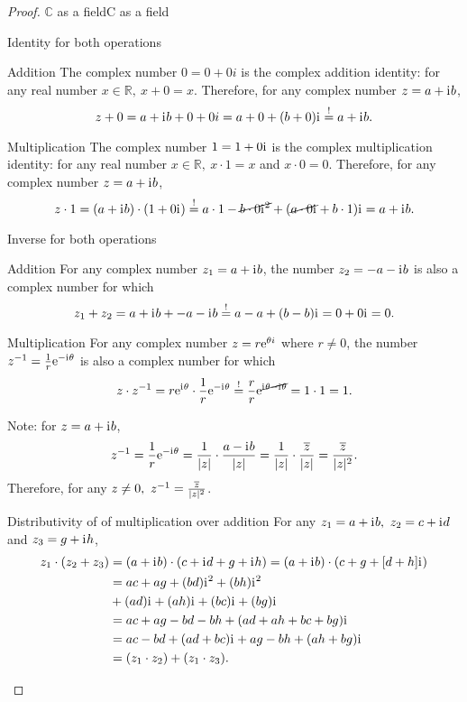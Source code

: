 \begin{proof}{$\bm{\mathbb{C}}$ as a field}{C as a field}
\begin{descitemize}
		\item[Identity for both operations]~\\
			\begin{listitemize}
			\item[Addition] The complex number $0=0+0i$ is the complex addition identity: for any real number $x\in\mathbb{R},\ x+0=x$. Therefore, for any complex number $z=a+\mathrm{i}\mkern1mu b$,
				\[
					z+0 = a+\mathrm{i}\mkern1mu b + 0+0i = a+0 + (b+0)\mathrm{i}\mkern1mu \overset{!}{=} a+\mathrm{i}\mkern1mu b.
				\]
			\item[Multiplication] The complex number $1=1+0\mathrm{i}\mkern1mu$ is the complex multiplication identity: for any real number $x\in\mathbb{R},\ x\cdot1=x$ and $x\cdot0=0$. Therefore, for any complex number $z=a+\mathrm{i}\mkern1mu b$,
				\[
					z\cdot1 = (a+\mathrm{i}\mkern1mu b)\cdot(1+0\mathrm{i}\mkern1mu) \overset{!}{=}a\cdot1-\cancel{b\cdot0\mathrm{i}\mkern1mu^{2}} + (\cancel{a\cdot0\mathrm{i}\mkern1mu}+b\cdot1)\mathrm{i}\mkern1mu = a+\mathrm{i}\mkern1mu b.
				\]

			\end{listitemize}
		
		\item[Inverse for both operations]~\\
			\begin{listitemize}
			\item[Addition] For any complex number $z_{1}=a+\mathrm{i}\mkern1mu b$, the number $z_{2}=-a-\mathrm{i}\mkern1mu b$ is also a complex number for which
				\[
					z_{1} + z_{2} = a+\mathrm{i}\mkern1mu b + -a-\mathrm{i}\mkern1mu b \overset{!}{=} a-a + (b-b)\mathrm{i}\mkern1mu = 0 + 0\mathrm{i}\mkern1mu = 0.
				\]
			\item[Multiplication] For any complex number $z=r\mathrm{e}^{\theta i}$ where $r\neq0$, the number $z^{-1}=\frac{1}{r}\mathrm{e}^{-\mathrm{i}\mkern1mu\theta}$ is also a complex number for which
				\[
					z \cdot z^{-1} = r\mathrm{e}^{\mathrm{i}\mkern1mu\theta} \cdot \frac{1}{r}\mathrm{e}^{-\mathrm{i}\mkern1mu\theta} \overset{!}{=} \frac{r}{r}\mathrm{e}^{\cancel{\mathrm{i}\mkern1mu\theta - \mathrm{i}\mkern1mu\theta}} = 1\cdot1 = 1.
				\]
				
			Note: for $z=a+\mathrm{i}\mkern1mu b$,
			\[
				z^{-1} = \frac{1}{r}\mathrm{e}^{-\mathrm{i}\mkern1mu\theta} = \frac{1}{|z|}\cdot\frac{a-\mathrm{i}\mkern1mu b}{|z|} = \frac{1}{|z|}\cdot\frac{\overline{z}}{|z|} = \frac{\overline{z}}{|z|^{2}}.
			\]
			Therefore, for any $z\neq0,\ z^{-1} = \frac{\overline{z}}{|z|^{2}}$.
			\end{listitemize}

		\item[Distributivity of of multiplication over addition] For any $z_{1}=a+\mathrm{i}\mkern1mu b,\ z_{2}=c+\mathrm{i}\mkern1mu d$ and $z_{3}=g+\mathrm{i}\mkern1mu h$,
			\begin{align*}
				z_{1}\cdot(z_{2}+z_{3}) &= (a+\mathrm{i}\mkern1mu b)\cdot(c+\mathrm{i}\mkern1mu d + g+\mathrm{i}\mkern1mu h) = (a+\mathrm{i}\mkern1mu b)\cdot(c+g + [d+h]\mathrm{i}\mkern1mu)\\
				&= ac + ag + (bd)\mathrm{i}\mkern1mu^{2} + (bh)\mathrm{i}\mkern1mu^{2}\\
				&+ (ad)\mathrm{i}\mkern1mu + (ah)\mathrm{i}\mkern1mu + (bc)\mathrm{i}\mkern1mu + (bg)\mathrm{i}\mkern1mu\\
				&= ac + ag - bd - bh + (ad + ah + bc + bg)\mathrm{i}\mkern1mu\\
				&= ac-bd + (ad+bc)\mathrm{i}\mkern1mu + ag-bh + (ah+bg)\mathrm{i}\mkern1mu\\
				&= (z_{1}\cdot z_{2}) + (z_{1}\cdot z_{3}).
			\end{align*}
	\end{descitemize}
\end{proof}

